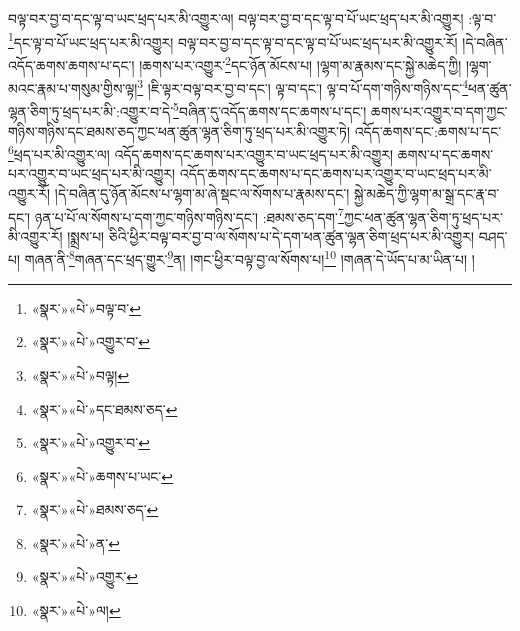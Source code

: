 བལྟ་བར་བྱ་བ་དང་ལྟ་བ་ཡང་ཕྲད་པར་མི་འགྱུར་ལ། བལྟ་བར་བྱ་བ་དང་ལྟ་བ་པོ་ཡང་ཕྲད་པར་མི་འགྱུར། :ལྟ་བ་\footnote{«སྣར་»«པེ་»བལྟ་བ་}དང་ལྟ་བ་པོ་ཡང་ཕྲད་པར་མི་འགྱུར། བལྟ་བར་བྱ་བ་དང་ལྟ་བ་དང་ལྟ་བ་པོ་ཡང་ཕྲད་པར་མི་འགྱུར་རོ། །དེ་བཞིན་འདོད་ཆགས་ཆགས་པ་དང་། །ཆགས་པར་འགྱུར་\footnote{«སྣར་»«པེ་»འགྱུར་བ་}དང་ཉོན་མོངས་པ། །ལྷག་མ་རྣམས་དང་སྐྱེ་མཆེད་ཀྱི། །ལྷག་མའང་རྣམ་པ་གསུམ་གྱིས་ལྟ།\footnote{«སྣར་»«པེ་»བལྟ།} །ཇི་ལྟར་བལྟ་བར་བྱ་བ་དང་། ལྟ་བ་དང་། ལྟ་བ་པོ་དག་གཉིས་གཉིས་དང་\footnote{«སྣར་»«པེ་»དང་ཐམས་ཅད་}ཕན་ཚུན་ལྷན་ཅིག་ཏུ་ཕྲད་པར་མི་:འགྱུར་བ་དེ་\footnote{«སྣར་»«པེ་»འགྱུར་བ་}བཞིན་དུ་འདོད་ཆགས་དང་ཆགས་པ་དང་། ཆགས་པར་འགྱུར་བ་དག་ཀྱང་གཉིས་གཉིས་དང་ཐམས་ཅད་ཀྱང་ཕན་ཚུན་ལྷན་ཅིག་ཏུ་ཕྲད་པར་མི་འགྱུར་ཏེ། འདོད་ཆགས་དང་:ཆགས་པ་དང་\footnote{«སྣར་»«པེ་»ཆགས་པ་ཡང་}ཕྲད་པར་མི་འགྱུར་ལ། འདོད་ཆགས་དང་ཆགས་པར་འགྱུར་བ་ཡང་ཕྲད་པར་མི་འགྱུར། ཆགས་པ་དང་ཆགས་པར་འགྱུར་བ་ཡང་ཕྲད་པར་མི་འགྱུར། འདོད་ཆགས་དང་ཆགས་པ་དང་ཆགས་པར་འགྱུར་བ་ཡང་ཕྲད་པར་མི་འགྱུར་རོ། །དེ་བཞིན་དུ་ཉོན་མོངས་པ་ལྷག་མ་ཞེ་སྡང་ལ་སོགས་པ་རྣམས་དང་། སྐྱེ་མཆེད་ཀྱི་ལྷག་མ་སྒྲ་དང་རྣ་བ་དང་། ཉན་པ་པོ་ལ་སོགས་པ་དག་ཀྱང་གཉིས་གཉིས་དང་། :ཐམས་ཅད་དག་\footnote{«སྣར་»«པེ་»ཐམས་ཅད་}ཀྱང་ཕན་ཚུན་ལྷན་ཅིག་ཏུ་ཕྲད་པར་མི་འགྱུར་རོ། །སྨྲས་པ། ཅིའི་ཕྱིར་བལྟ་བར་བྱ་བ་ལ་སོགས་པ་དེ་དག་ཕན་ཚུན་ལྷན་ཅིག་ཕྲད་པར་མི་འགྱུར། བཤད་པ། གཞན་ནི་\footnote{«སྣར་»«པེ་»ན་}གཞན་དང་ཕྲད་གྱུར་\footnote{«སྣར་»«པེ་»འགྱུར་}ན། །གང་ཕྱིར་བལྟ་བྱ་ལ་སོགས་པ།\footnote{«སྣར་»«པེ་»ལ།} །གཞན་དེ་ཡོད་པ་མ་ཡིན་པ། །
